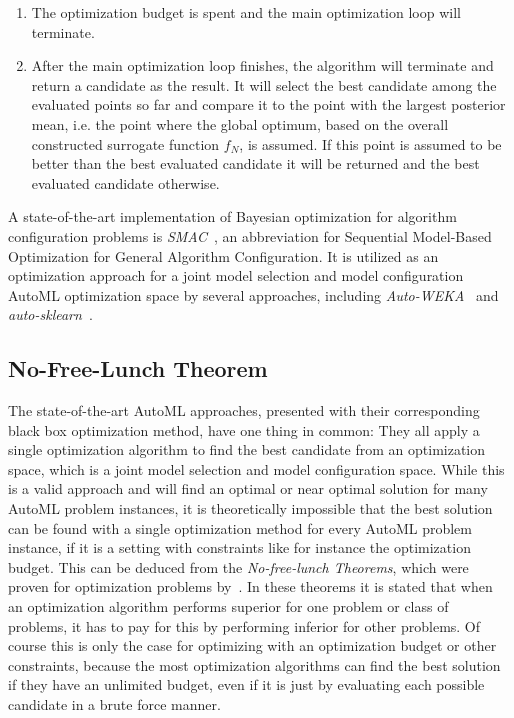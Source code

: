 \begin{enumerate}
    \item The optimization budget is spent and the main optimization loop will terminate.
    \item After the main optimization loop finishes, the algorithm will terminate and return a candidate as the result.
    It will select the best candidate among the evaluated points so far and compare it to the point with the largest posterior mean, i.e. the point where the global optimum, based on the overall constructed surrogate function $f_N$, is assumed.
    If this point is assumed to be better than the best evaluated candidate it will be returned and the best evaluated candidate otherwise.
\end{enumerate}
A state-of-the-art implementation of Bayesian optimization for algorithm configuration problems is \textit{SMAC}~\cite{Hutter-SMAC}, an abbreviation for Sequential Model-Based Optimization for General Algorithm Configuration.
It is utilized as an optimization approach for a joint model selection and model configuration AutoML optimization space by several approaches, including \textit{Auto-WEKA}~\cite{Thornton-AutoWeka} and \textit{auto-sklearn}~\cite{Feurer-AutoSklearn}.

\subsection{No-Free-Lunch Theorem}
\label{sec:theory:optimization:lunch}
The state-of-the-art AutoML approaches, presented with their corresponding black box optimization method, have one thing in common: They all apply a single optimization algorithm to find the best candidate from an optimization space, which is a joint model selection and model configuration space.
While this is a valid approach and will find an optimal or near optimal solution for many AutoML problem instances, it is theoretically impossible that the best solution can be found with a single optimization method for every AutoML problem instance, if it is a setting with constraints like for instance the optimization budget.\newline
This can be deduced from the \textit{No-free-lunch Theorems}, which were proven for optimization problems by~\textcite{Wolpert-No-Free-Lunch-Theorems}.
In these theorems it is stated that when an optimization algorithm performs superior for one problem or class of problems, it has to pay for this by performing inferior for other problems.
Of course this is only the case for optimizing with an optimization budget or other constraints, because the most optimization algorithms can find the best solution if they have an unlimited budget, even if it is just by evaluating each possible candidate in a brute force manner.

